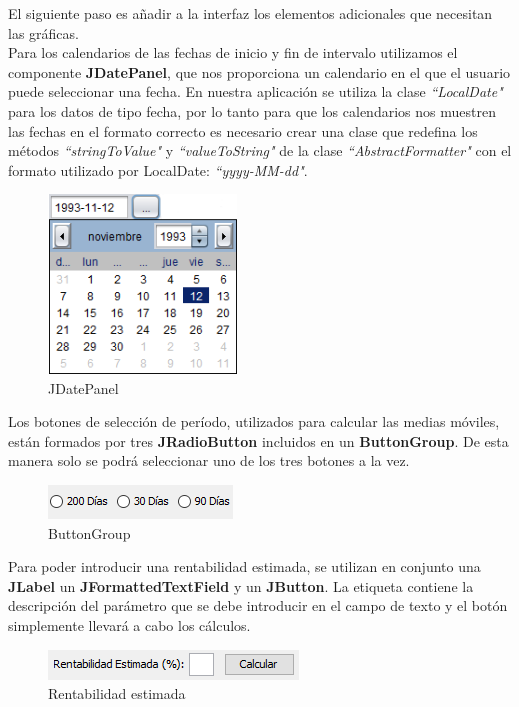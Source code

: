 \documentclass[12pt, a4paper]{book}
\begin{document}
El siguiente paso es añadir a la interfaz los elementos adicionales que necesitan las gráficas.\\

Para los calendarios de las fechas de inicio y fin de intervalo utilizamos el componente \textbf{JDatePanel}, que nos proporciona un calendario en el que el usuario puede seleccionar una fecha. En nuestra aplicación se utiliza la clase \textit{``LocalDate"} para los datos de tipo fecha, por lo tanto para que los calendarios nos muestren las fechas en el formato correcto es necesario crear una clase que redefina los métodos \textit{``stringToValue"} y \textit{``valueToString"} de la clase \textit{``AbstractFormatter"} con el formato utilizado por LocalDate: \textit{``yyyy-MM-dd"}.

\begin{figure}[htbp]
	\centering
	\includegraphics[width=5cm]{figuras/JDatePanel.png}
	\caption{JDatePanel}
	\label{fig:JDatePanel}
	\end {figure}

Los botones de selección de período, utilizados para calcular las medias móviles, están formados por tres \textbf{JRadioButton} incluidos en un \textbf{ButtonGroup}. De esta manera solo se podrá seleccionar uno de los tres botones a la vez.

\begin{figure}[htbp]
	\centering
	\includegraphics{figuras/ButtonGroup.png}
	\caption{ButtonGroup}
	\label{fig:ButtonGroup}
	\end {figure}
	
Para poder introducir una rentabilidad estimada, se utilizan en conjunto una \textbf{JLabel} un \textbf{JFormattedTextField} y un \textbf{JButton}. La etiqueta contiene la descripción del parámetro que se debe introducir en el campo de texto y el botón simplemente llevará a cabo los cálculos.

\begin{figure}[htbp]
	\centering
	\includegraphics{figuras/Calculos.png}
	\caption{Rentabilidad estimada}
	\label{fig:calculos}
	\end {figure}
\end{document}
